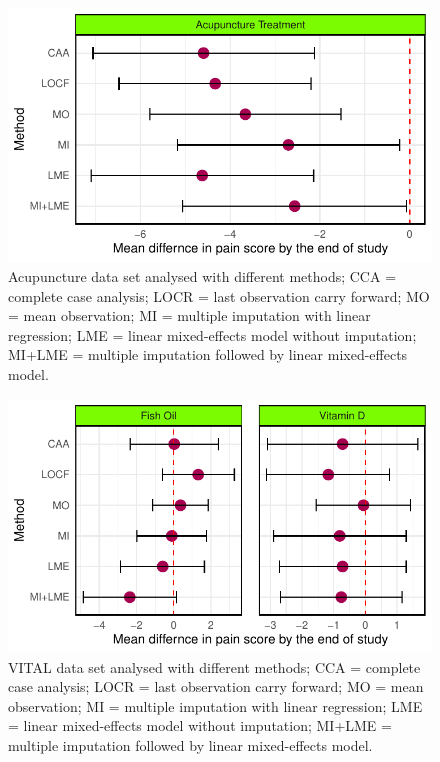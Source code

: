 \documentclass{article}
\newcommand{\pandocbounded}[1]{#1}
\begin{document}
\begin{figure}
\centering
\pandocbounded{\includegraphics[keepaspectratio]{Final_Report_files/figure-latex/unnamed-chunk-28-1.pdf}}
\caption{Acupuncture data set analysed with different methods; CCA =
complete case analysis; LOCR = last observation carry forward; MO = mean
observation; MI = multiple imputation with linear regression; LME =
linear mixed-effects model without imputation; MI+LME = multiple
imputation followed by linear mixed-effects model.}
\end{figure}

\begin{figure}
\centering
\pandocbounded{\includegraphics[keepaspectratio]{Final_Report_files/figure-latex/unnamed-chunk-29-1.pdf}}
\caption{VITAL data set analysed with different methods; CCA = complete
case analysis; LOCR = last observation carry forward; MO = mean
observation; MI = multiple imputation with linear regression; LME =
linear mixed-effects model without imputation; MI+LME = multiple
imputation followed by linear mixed-effects model.}
\end{figure}
\end{document}
